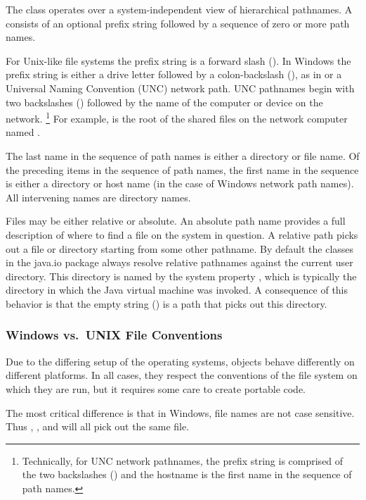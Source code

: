 The  class operates over a system-independent
view of hierarchical pathnames.
A  consists of an optional prefix string
followed by a sequence of zero or more path names.  

For Unix-like file systems the prefix string is a forward slash (\code{/}).
In Windows the prefix string is either a drive letter followed by
a colon-backslash (\code{:\bk}), as in  or a 
Universal Naming Convention (UNC) network path.
UNC pathnames begin with two backslashes (\code{\bk\bk}) followed by the name of the
computer or device on the network.%
%
\footnote{Technically, for UNC network pathnames, 
the prefix string is comprised
of the two backslashes (\code{\bk\bk}) and 
the hostname is the first name in the sequence of path names.}
%
For example,  is the root of the shared files on the network
computer named .

The last name in the sequence of path names is either a directory or file name.
Of the preceding items in the sequence of path names, the first name
in the sequence is either a directory or host name
(in the case of Windows network path names).
All intervening names are directory names.

Files may be either relative or absolute.  An absolute path name
provides a full description of where to find a file on the system in
question.  A relative path picks out a file or directory starting from
some other pathname.  By default the classes in the java.io package always
resolve relative pathnames against the current user directory.
This directory is named by the system property ,
which is typically the directory in which the Java virtual machine was invoked.
A consequence of this behavior is that the empty string () is
a path that picks out this directory.

\subsubsection{Windows vs.\ UNIX File Conventions}

Due to the differing setup of the operating systems, 
objects behave differently on different platforms.  In all cases, they
respect the conventions of the file system on which they are run, but
it requires some care to create portable code.

The most critical difference is that in Windows, file names are not case
sensitive.  Thus , , and  will all pick
out the same file.  

